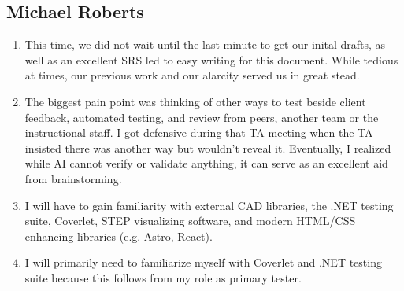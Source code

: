 \documentclass[12pt, titlepage]{article}
\begin{document}
\subsection*{Michael Roberts}
\begin{enumerate}
    \item This time, we did not wait until the last minute to get our inital drafts, as well as an excellent SRS led to easy writing for this document. While tedious at times, our previous work and our alarcity served us in great stead.
    \item The biggest pain point was thinking of other ways to test beside client feedback, automated testing, and review from peers, another team or the instructional staff. I got defensive during that TA meeting when the TA insisted there was another way but wouldn't reveal it. Eventually, I realized while AI cannot verify or validate anything, it can serve as an excellent aid from brainstorming.
    \item I will have to gain familiarity with external CAD libraries, the .NET testing suite, Coverlet, STEP visualizing software, and modern HTML/CSS enhancing libraries (e.g. Astro, React). 
    \item I will primarily need to familiarize myself with Coverlet and .NET testing suite because this follows from my role as primary tester.
  \end{enumerate}
\end{document}
